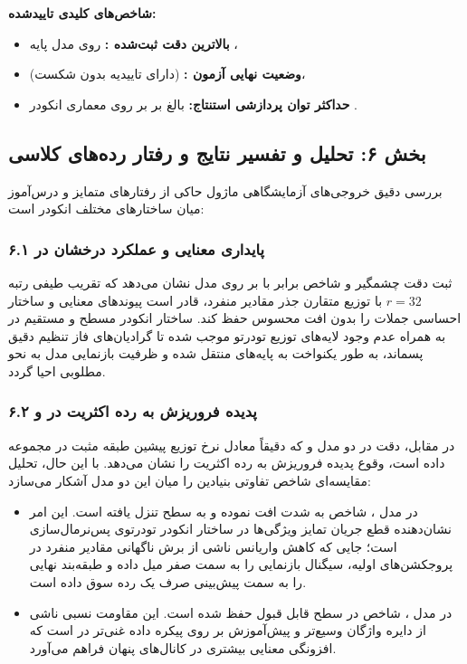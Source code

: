 \textbf{شاخص‌های کلیدی تاییدشده:}
\begin{itemize}
    \item \textbf{بالاترین دقت ثبت‌شده :}  روی مدل پایه ،
    \item \textbf{وضعیت نهایی آزمون :}  (دارای تاییدیه بدون شکست)،
    \item \textbf{حداکثر توان پردازشی استنتاج:} بالغ بر  بر روی معماری انکودر .
\end{itemize}

\subsection*{بخش ۶: تحلیل و تفسیر نتایج و رفتار رده‌های کلاسی }

بررسی دقیق خروجی‌های آزمایشگاهی ماژول  حاکی از رفتارهای متمایز و درس‌آموز میان ساختارهای مختلف انکودر است:

\subsubsection*{۶.۱ پایداری معنایی و عملکرد درخشان در }
ثبت دقت چشمگیر  و شاخص  برابر با  بر روی مدل  نشان می‌دهد که تقریب طیفی رتبه $r = 32$ با توزیع متقارن جذر مقادیر منفرد، قادر است پیوندهای معنایی و ساختار احساسی جملات را بدون افت محسوس حفظ کند. ساختار انکودر مسطح و مستقیم در  به همراه عدم وجود لایه‌های توزیع تودرتو موجب شده تا گرادیان‌های فاز تنظیم دقیق پسماند، به طور یکنواخت به پایه‌های  منتقل شده و ظرفیت بازنمایی مدل به نحو مطلوبی احیا گردد.

\subsubsection*{۶.۲ پدیده فروریزش به رده اکثریت  در  و }
در مقابل، دقت  در دو مدل  و  که دقیقاً معادل نرخ توزیع پیشین طبقه مثبت در مجموعه داده  است، وقوع پدیده فروریزش به رده اکثریت را نشان می‌دهد. با این حال، تحلیل مقایسه‌ای شاخص  تفاوتی بنیادین را میان این دو مدل آشکار می‌سازد:
\begin{itemize}
    \item در مدل ، شاخص  به شدت افت نموده و به سطح  تنزل یافته است. این امر نشان‌دهنده قطع جریان تمایز ویژگی‌ها در ساختار انکودر تودرتوی پس‌نرمال‌سازی  است؛ جایی که کاهش واریانس ناشی از برش ناگهانی مقادیر منفرد در پروجکشن‌های اولیه، سیگنال بازنمایی را به سمت صفر میل داده و طبقه‌بند نهایی را به سمت پیش‌بینی صرف یک رده سوق داده است.
    \item در مدل ، شاخص  در سطح قابل قبول  حفظ شده است. این مقاومت نسبی ناشی از دایره واژگان وسیع‌تر  و پیش‌آموزش بر روی پیکره داده غنی‌تر در  است که افزونگی معنایی بیشتری در کانال‌های پنهان فراهم می‌آورد.
\end{itemize}

